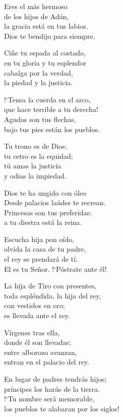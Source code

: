 \documentclass[12pt, letterpaper]{report}
\begin{document}
    \noindent
    \LARGE Eres el m\'as hermoso\\
    de los hijos de Ad\'an,\\
    la gracia est\'a en tus labios.\\
    Dios te bendijo para siempre.

    \noindent
    Ci\~ne tu espada al costado,\\
    en tu gloria y tu esplendor\\
    cabalga por la verdad,\\
    la piedad y la justicia.

    \noindent
    !`Tensa la cuerda en el arco,\\
    que hace terrible a tu derecha!\\
    Agudas son tus flechas,\\
    bajo tus pies est\'an los pueblos.

    \noindent
    Tu trono es de Dios;\\
    tu cetro es la equidad;\\
    t\'u amas la justicia\\
    y odias la impiedad.

    \noindent
    Dios te ha ungido con \'oleo\\
    Desde palacios la\'udes te recrean.\\
    Princesas son tus preferidas;\\
    a tu diestra est\'a la reina.

    \noindent
    Escucha hija pon o\'ido,\\
    olvida la casa de tu padre,\\
    el rey se prendar\'a de t\'i.\\
    El es tu Se\~nor. !`P\'ostrate ante \'el!

    \noindent
    La hija de Tiro con presentes,\\
    toda espl\'endida, la hija del rey,\\
    con vestidos en oro;\\
    es llevada ante el rey.

    \noindent
    V\'irgenes tras ella,\\
    donde \'el son llevadas;\\
    entre alborozo avanzan,\\
    entran en el palacio del rey.

    \noindent
    En lugar de padres tendr\'as hijos;\\
    pr\'incipes los har\'as de la tierra.\\
    !`Tu nombre ser\'a memorable,\\
    los pueblos te alabaran por los siglos!
    \clearpage
\end{document}
